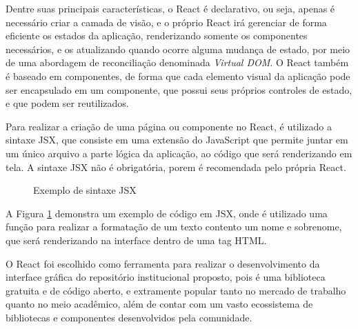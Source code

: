 Dentre suas principais características, o React é declarativo, ou seja,
apenas é necessário criar a camada de visão, e o próprio React irá gerenciar
de forma eficiente os estados da aplicação, renderizando somente os componentes
necessários, e os atualizando quando ocorre alguma mudança de estado, por meio
de uma abordagem de reconciliação denominada \emph{Virtual DOM}. O React
também é baseado em componentes, de forma que cada elemento visual da aplicação
pode ser encapsulado em um componente, que possui seus próprios controles de estado,
e que podem ser reutilizados.

Para realizar a criação de uma página ou componente no React, é utilizado a
sintaxe JSX, que consiste em uma extensão do JavaScript que permite juntar
em um único arquivo a parte lógica da aplicação, ao código que será renderizando em
tela. A sintaxe JSX não é obrigatória, porem é recomendada pelo própria React.

\begin{figure}[H]
    \caption{Exemplo de sintaxe JSX}
    \centering
    \label{fig:exemple-jsx}
\end{figure}

A Figura \ref{fig:exemple-jsx} demonstra um exemplo de código em JSX, onde é
utilizado uma função para realizar a formatação de um texto contento um
nome e sobrenome, que será renderizando na interface dentro de uma
tag HTML.

O React foi escolhido como ferramenta para realizar o desenvolvimento da
interface gráfica do repositório institucional proposto, pois é uma biblioteca
gratuita e de código aberto, e extramente popular tanto no mercado de trabalho
quanto no meio acadêmico, além de contar com um vasto ecossistema de bibliotecas
e componentes desenvolvidos pela comunidade.

